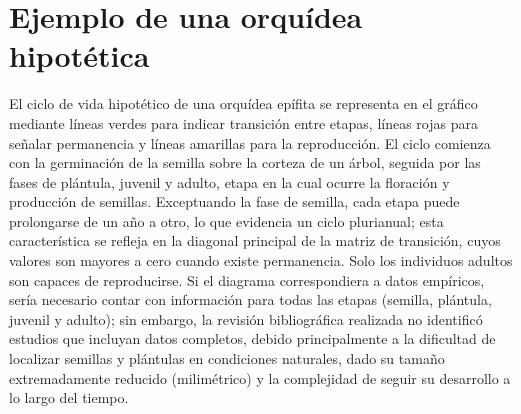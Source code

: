 \documentclass[
  12pt,
  letterpaper,
]{book}
\begin{document}
\section{Ejemplo de una orquídea
hipotética}\label{ejemplo-de-una-orquuxeddea-hipotuxe9tica}

El ciclo de vida hipotético de una orquídea epífita se representa en el
gráfico mediante líneas verdes para indicar transición entre etapas,
líneas rojas para señalar permanencia y líneas amarillas para la
reproducción. El ciclo comienza con la germinación de la semilla sobre
la corteza de un árbol, seguida por las fases de plántula, juvenil y
adulto, etapa en la cual ocurre la floración y producción de semillas.
Exceptuando la fase de semilla, cada etapa puede prolongarse de un año a
otro, lo que evidencia un ciclo plurianual; esta característica se
refleja en la diagonal principal de la matriz de transición, cuyos
valores son mayores a cero cuando existe permanencia. Solo los
individuos adultos son capaces de reproducirse. Si el diagrama
correspondiera a datos empíricos, sería necesario contar con información
para todas las etapas (semilla, plántula, juvenil y adulto); sin
embargo, la revisión bibliográfica realizada no identificó estudios que
incluyan datos completos, debido principalmente a la dificultad de
localizar semillas y plántulas en condiciones naturales, dado su tamaño
extremadamente reducido (milimétrico) y la complejidad de seguir su
desarrollo a lo largo del tiempo.
\end{document}
